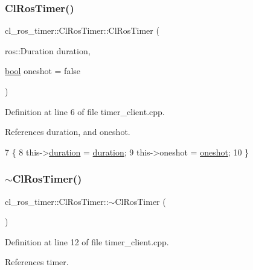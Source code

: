 \subsubsection{\texorpdfstring{Cl\+Ros\+Timer()}{ClRosTimer()}}
{\footnotesize\ttfamily cl\+\_\+ros\+\_\+timer\+::\+Cl\+Ros\+Timer\+::\+Cl\+Ros\+Timer (\begin{DoxyParamCaption}\item[{ros\+::\+Duration}]{duration,  }\item[{\hyperlink{classbool}{bool}}]{oneshot = {\ttfamily false} }\end{DoxyParamCaption})}



Definition at line 6 of file timer\+\_\+client.\+cpp.



References duration, and oneshot.


\begin{DoxyCode}
7 \{
8     this->\hyperlink{classcl__ros__timer_1_1ClRosTimer_a39a5666044409eca94562fcceca8b0ea}{duration} = \hyperlink{classcl__ros__timer_1_1ClRosTimer_a39a5666044409eca94562fcceca8b0ea}{duration};
9     this->oneshot = \hyperlink{classcl__ros__timer_1_1ClRosTimer_a07ce4ac2560aa7ad4b5dee233f2d7733}{oneshot};
10 \}
\end{DoxyCode}
\mbox{\label{classcl__ros__timer_1_1ClRosTimer_a94a600197795e0235e86461a90c8cd7d}} 
\subsubsection{\texorpdfstring{$\sim$\+Cl\+Ros\+Timer()}{~ClRosTimer()}}
{\footnotesize\ttfamily cl\+\_\+ros\+\_\+timer\+::\+Cl\+Ros\+Timer\+::$\sim$\+Cl\+Ros\+Timer (\begin{DoxyParamCaption}{ }\end{DoxyParamCaption})\hspace{0.3cm}{\ttfamily [virtual]}}



Definition at line 12 of file timer\+\_\+client.\+cpp.



References timer.



